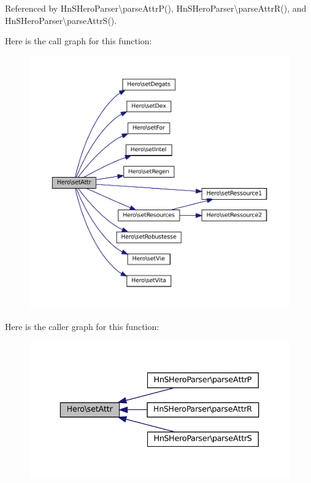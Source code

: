 Referenced by Hn\+S\+Hero\+Parser\textbackslash{}parse\+Attr\+P(), Hn\+S\+Hero\+Parser\textbackslash{}parse\+Attr\+R(), and Hn\+S\+Hero\+Parser\textbackslash{}parse\+Attr\+S().

Here is the call graph for this function\+:\nopagebreak
\begin{figure}[H]
\begin{center}
\leavevmode
\includegraphics[width=350pt]{class_hero_a4936f4afc1324ed3ae4a90a91fd16eb1_cgraph}
\end{center}
\end{figure}
Here is the caller graph for this function\+:\nopagebreak
\begin{figure}[H]
\begin{center}
\leavevmode
\includegraphics[width=336pt]{class_hero_a4936f4afc1324ed3ae4a90a91fd16eb1_icgraph}
\end{center}
\end{figure}
\mbox{\label{class_hero_a25f381160b165cd5e6210d7c6b86062f}} 

